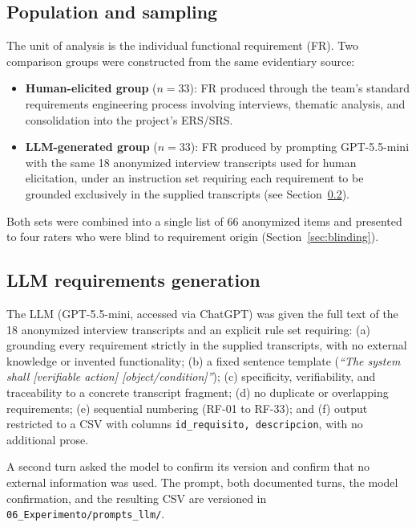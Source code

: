 \documentclass[pdflatex,sn-basic]{sn-jnl}
\begin{document}
\subsection{Population and sampling}

The unit of analysis is the individual functional requirement (FR). Two comparison groups were constructed from the same evidentiary source:

\begin{itemize}[leftmargin=1.2cm]
\item \textbf{Human-elicited group} ($n = 33$): FR produced through the team's standard requirements engineering process involving interviews, thematic analysis, and consolidation into the project's ERS/SRS.
\item \textbf{LLM-generated group} ($n = 33$): FR produced by prompting GPT-5.5-mini with the same 18 anonymized interview transcripts used for human elicitation, under an instruction set requiring each requirement to be grounded exclusively in the supplied transcripts (see Section~\ref{sec:llm-prompt}).
\end{itemize}

Both sets were combined into a single list of 66 anonymized items and presented to four raters who were blind to requirement origin (Section~\ref{sec:blinding}).

\subsection{LLM requirements generation}
\label{sec:llm-prompt}

The LLM (GPT-5.5-mini, accessed via ChatGPT) was given the full text of the 18 anonymized interview transcripts and an explicit rule set requiring: (a) grounding every requirement strictly in the supplied transcripts, with no external knowledge or invented functionality; (b) a fixed sentence template (\textit{``The system shall [verifiable action] [object/condition]''}); (c) specificity, verifiability, and traceability to a concrete transcript fragment; (d) no duplicate or overlapping requirements; (e) sequential numbering (RF-01 to RF-33); and (f) output restricted to a CSV with columns \texttt{id\_requisito, descripcion}, with no additional prose.

A second turn asked the model to confirm its version and confirm that no external information was used. The prompt, both documented turns, the model confirmation, and the resulting CSV are versioned in \texttt{06\_Experimento/prompts\_llm/}.
\end{document}
